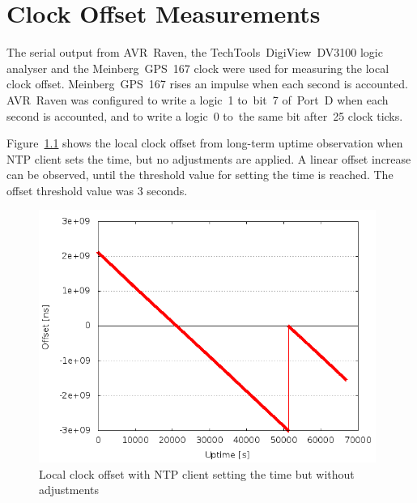 \chapter{Clock Offset Measurements}\label{app:offset}
The serial output from AVR~Raven,
the TechTools~DigiView~DV3100 logic analyser and the Meinberg~GPS~167 clock
were used for measuring the local clock offset.
Meinberg~GPS~167 rises an impulse when each second is accounted.
AVR~Raven was configured to write a logic~1
to~bit~7 of~Port~D when each second is accounted,
and to write a logic~0 to~the same bit after~25 clock ticks.

Figure~\ref{fig:app-ntp-set-time} shows the local clock offset from long-term uptime
observation when NTP client sets the time, but no adjustments are applied.
A linear offset increase can be observed, until the threshold value
for setting the time is reached.
The offset threshold value was 3 seconds.
\begin{figure}[H]
  \centering
  \includegraphics[width=11cm,keepaspectratio]{fig/set-time-3s.png}
  \caption{Local clock offset with NTP client setting the time but without adjustments}
  \label{fig:app-ntp-set-time}
\end{figure}

